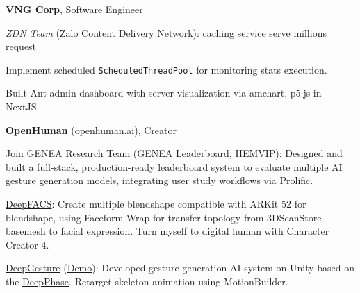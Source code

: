 \cvspace

\begin{twocolentry}{
	}
	\textbf{VNG Corp}, Software Engineer
	
	\textit{ZDN Team} (Zalo Content Delivery Network): caching service serve millions request
	\begin{highlights}
		\item Implement scheduled \texttt{ScheduledThreadPool} for monitoring stats execution.
		\item Built Ant admin dashboard with server visualization via amchart, p5.js in NextJS.
	\end{highlights}
\end{twocolentry}

\begin{twocolentry}{
	}
	\href{https://www.linkedin.com/company/openhuman/}{\textbf{OpenHuman}} (\href{https://openhuman.ai}{openhuman.ai}), Creator
	
	\begin{highlights}
		\item Join GENEA Research Team (\href{https://genealeaderboard.github.io}{GENEA Leaderboard}, \href{https://github.com/hemvip/hemvip.github.io}{HEMVIP}): Designed and built a full-stack, production-ready leaderboard system to evaluate multiple AI gesture generation models, integrating user study workflows via Prolific.
		
		
		
		\item  \href{https://github.com/DeepFACS}{DeepFACS}: Create multiple blendshape compatible with ARKit 52 for blendshape, using Faceform Wrap for transfer topology from 3DScanStore basemesh to facial expression. Turn myself to digital human with Character Creator 4.
		
		\item \href{https://github.com/DeepGesture/DeepGesture-Unity}{DeepGesture} (\href{https://www.youtube.com/watch?v=eZghfNGmZn8}{Demo}): Developed gesture generation AI system on Unity based on the \href{https://www.youtube.com/watch?v=YhH4PYEkVnY}{DeepPhase}. Retarget skeleton animation using MotionBuilder.
	\end{highlights}
	
\end{twocolentry}
